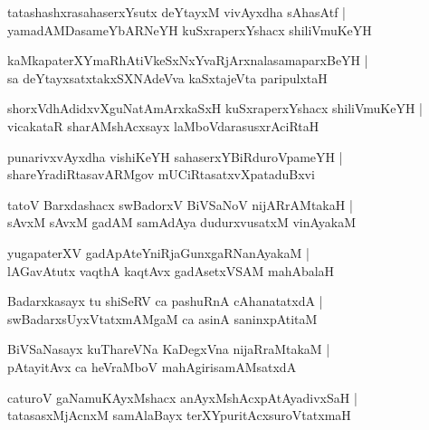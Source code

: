 \documentclass[twoside,12pt,openright]{book}
\newcounter{shloka}[chapter]
\begin{document}
\begin{shloka}%
tatashashxrasahaserxYsutx deYtayxM vivAyxdha sAhasAtf |\\
yamadAMDasameYbARNeYH kuSxraperxYshacx shiliVmuKeYH 
\end{shloka}

\begin{shloka}%
kaMkapaterXYmaRhAtiVkeSxNxYvaRjArxnalasamaparxBeYH |\\
sa deYtayxsatxtakxSXNAdeVva kaSxtajeVta paripulxtaH 
\end{shloka}

\begin{shloka}%
shorxVdhAdidxvXguNatAmArxkaSxH kuSxraperxYshacx shiliVmuKeYH |\\
vicakataR sharAMshAcxsayx laMboVdarasusxrAciRtaH 
\end{shloka}

\begin{shloka}%
punarivxvAyxdha vishiKeYH sahaserxYBiRduroVpameYH |\\
shareYradiRtasavARMgov mUCiRtasatxvXpataduBxvi
\end{shloka}

\begin{shloka}%
tatoV Barxdashacx swBadorxV BiVSaNoV nijARrAMtakaH |\\
sAvxM sAvxM gadAM samAdAya dudurxvusatxM vinAyakaM 
\end{shloka}

\begin{shloka}%
yugapaterXV gadApAteYniRjaGunxgaRNanAyakaM |\\
lAGavAtutx vaqthA kaqtAvx gadAsetxVSAM mahAbalaH 
\end{shloka}

\begin{shloka}%
Badarxkasayx tu shiSeRV ca pashuRnA cAhanatatxdA |\\
swBadarxsUyxVtatxmAMgaM ca asinA saninxpAtitaM 
\end{shloka}

\begin{shloka}%
BiVSaNasayx kuThareVNa KaDegxVna nijaRraMtakaM |\\
pAtayitAvx ca heVraMboV mahAgirisamAMsatxdA 
\end{shloka}

\begin{shloka}%
caturoV gaNamuKAyxMshacx anAyxMshAcxpAtAyadivxSaH |\\
tatasasxMjAcnxM samAlaBayx terXYpuritAcxsuroVtatxmaH 
\end{shloka}
\end{document}
